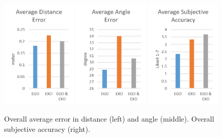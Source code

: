 \begin{figure}[htb]
	\centering
	\includegraphics[width=0.32\textwidth]{figures/averageDistanceError.png}
	\includegraphics[width=0.32\textwidth]{figures/averageAngleError.png}
	\includegraphics[width=0.32\textwidth]{figures/averageSubjectiveAccuracy.png}
	\caption[Overall accuracy]{Overall average error in distance (left) and angle (middle). Overall subjective accuracy (right).}
	\label{fig:cumulatedError}
\end{figure}


